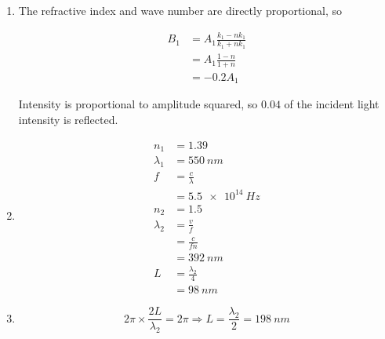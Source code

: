 \documentclass{article}
\begin{document}
\begin{enumerate}
  \item The refractive index and wave number are directly proportional, so

        \begin{align*}
          B_1 & = A_1 \frac{k_1 - n k_1}{k_1 + n k_1} \\
              & = A_1 \frac{1 - n}{1 + n}             \\
              & = -0.2 A_1
        \end{align*}

        Intensity is proportional to amplitude squared, so $0.04$ of the incident light intensity is reflected.

  \item

        \begin{align*}
          n_1       & = 1.39                \\
          \lambda_1 & = \qty{550}{nm}       \\
          f         & = \frac{c}{\lambda}   \\
                    & = \qty{5.5e14}{Hz}    \\
          n_2       & = 1.5                 \\
          \lambda_2 & = \frac{v}{f}         \\
                    & = \frac{c}{f n}       \\
                    & = \qty{392}{nm}       \\
          L         & = \frac{\lambda_2}{4} \\
                    & = \qty{98}{nm}
        \end{align*}

  \item \[2 \pi \times \frac{2 L}{\lambda_2} = 2 \pi \Rightarrow L = \frac{\lambda_2}{2} = \qty{198}{nm}\]
\end{enumerate}

\subsection{}
\end{document}
